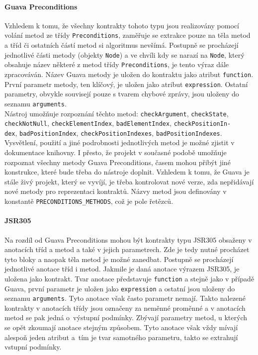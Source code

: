 			\paragraph{Guava Preconditions}
				Vzhledem k tomu, že všechny kontrakty tohoto typu jsou realizovány pomocí volání metod ze třídy \texttt{Preconditions}, zaměřuje se extrakce pouze na těla metod a tříd či ostatních částí metod si algoritmus nevšímá. Postupně se procházejí jednotlivé části metody (objekty \texttt{Node}) a ve chvíli kdy se narazí na \texttt{Node}, který obsahuje název některé z metod třídy \texttt{Preconditions}, je tento výraz dále zpracováván. Název Guava metody je uložen do kontraktu jako atribut \texttt{function}. První parametr metody, ten klíčový, je uložen jako atribut \texttt{expression}. Ostatní parametry, obvykle souvisejí pouze s tvarem chybové zprávy, jsou uloženy do seznamu \texttt{arguments}.\\				
				
				Nástroj umožňuje rozpoznání těchto metod: \texttt{checkArgument}, \texttt{checkState}, \texttt{checkNotNull}, \texttt{checkElementIndex}, \texttt{badElementIndex}, \texttt{checkPositionIn-}\\\texttt{dex}, \texttt{badPositionIndex}, \texttt{checkPositionIndexes}, \texttt{badPositionIndexes}.\\
				
				Vysvětlení, použití a jiné podrobnosti jednotlivých metod je možné zjistit v dokumentace knihovny. I přesto, že projekt v současné podobě umožňuje rozpoznat všechny metody Guava Preconditions, časem mohou přibýt jiné konstrukce, které bude třeba do nástroje doplnit. Vzhledem k tomu, že Guava je stále živý projekt, který se vyvíjí, je třeba kontrolovat nové verze, zda nepřidávají nové metody pro reprezentaci kontraktů.	Názvy metod jsou definovány v konstantě \texttt{PRECONDITIONS\_METHODS}, což je pole řetězců.
				
			\paragraph{JSR305}
				Na rozdíl od Guava Preconditions mohou být kontrakty typu JSR305 obsaženy v anotacích tříd a metod a také v jejich parametrech. Zde je tedy nutné procházet tyto bloky a naopak těla metod je možné zanedbat. Postupně se procházejí jednotlivé anotace tříd i metod. Jakmile je daná anotace výrazem JSR305, je uložena jako kontrakt. Tvar anotace představuje \texttt{function} a stejně jako v případě Guava, první parametr je uložen jako \texttt{expression} a ostatní jsou uloženy do seznamu \texttt{arguments}. Tyto anotace však často parametr nemají. Takto nalezené kontrakty v anotacích třídy jsou označeny za neměnné proměnné a v anotacích metod se pak jedná o~výstupní podmínky. Zbývají parametry metod, u kterých se opět zkoumají anotace stejným způsobem. Tyto anotace však vždy mívají alespoň jeden atribut a~tím je tvar samotného parametru, takto se extrahují vstupní podmínky.\\			

